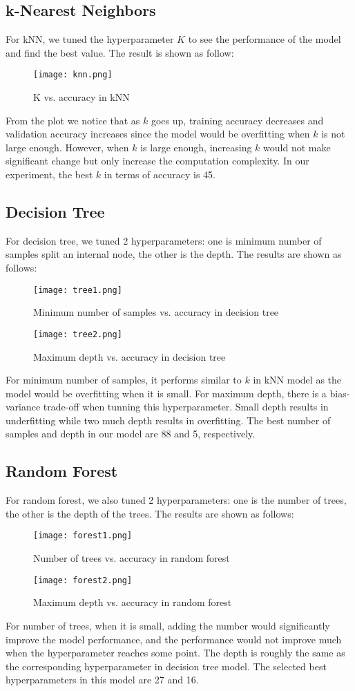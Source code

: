 \documentclass[11pt]{article}
\begin{document}
\subsection{k-Nearest Neighbors}
For kNN, we tuned the hyperparameter $K$ to see the performance of the model and find the best value. The result is shown as follow:
\begin{figure}[H]
	\centering
	\texttt{[image: knn.png]}     
	\caption{K vs. accuracy in kNN}
\end{figure}
\noindent From the plot we notice that as $k$ goes up, training accuracy decreases and validation accuracy increases since the model would be overfitting when $k$ is not large enough. However, when $k$ is large enough, increasing $k$ would not make significant change but only increase the computation complexity. In our experiment, the best $k$ in terms of accuracy is 45.
\subsection{Decision Tree}
For decision tree, we tuned 2 hyperparameters: one is minimum number of samples split an internal node, the other is the depth. The results are shown as follows:
\begin{figure}[H]
	\centering
	\texttt{[image: tree1.png]}     
	\caption{Minimum number of samples vs. accuracy in decision tree}
\end{figure}
\begin{figure}[H]
	\centering
	\texttt{[image: tree2.png]}     
	\caption{Maximum depth vs. accuracy in decision tree}
\end{figure}
\noindent For minimum number of samples, it performs similar to $k$ in kNN model as the model would be overfitting when it is small. For maximum depth, there is a bias-variance trade-off when tunning this hyperparameter. Small depth results in underfitting while two much depth results in overfitting. The best number of samples and depth in our model are 88 and 5, respectively.
\subsection{Random Forest}
For random forest, we also tuned 2 hyperparameters: one is the number of trees, the other is the depth of the trees. The results are shown as follows:
\begin{figure}[H]
	\centering
	\texttt{[image: forest1.png]}     
	\caption{Number of trees vs. accuracy in random forest}
\end{figure}
\begin{figure}[H]
	\centering
	\texttt{[image: forest2.png]}     
	\caption{Maximum depth vs. accuracy in random forest}
\end{figure}
\newpage
\noindent For number of trees, when it is small, adding the number would significantly improve the model performance, and the performance would not improve much when the hyperparameter reaches some point. The depth is roughly the same as the corresponding hyperparameter in decision tree model. The selected best hyperparameters in this model are 27 and 16.
\end{document}
